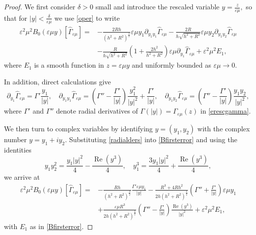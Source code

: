 \documentclass[11pt,reqno,a4paper]{amsart}
\numberwithin{equation}{section}
\newcommand{\ve}{\varepsilon}
\begin{document}
\begin{proof}
We first consider $\delta>0$ small and introduce the rescaled variable $y=\frac{z}{\ve\mu},$ so that for $|y|<\frac {\delta}{\ve\mu}$ we use \eqref{oper} to write
\begin{equation}\label{Bfirsterror}
\begin{aligned}
\ve^2\mu^2 B_{0}(\ve\mu y)[\widehat{\Gamma}_{\ve\mu}]
=& -\frac{2Rh}{(h^2+R^2)^{\frac 3 2}}\ve \mu y_1\partial_{y_1y_1}\widehat{\Gamma}_{\ve\mu}-\frac{2R}{h\sqrt{h^2+R^2}}\ve \mu y_2\partial_{y_1y_2}\widehat{\Gamma}_{\ve\mu}\\
&- \frac{R}{h\sqrt{h^2+R^2}}\left(1+\frac{2h^2}{h^2+R^2}\right)\ve\mu
\partial_{y_1}\widehat{\Gamma}_{\ve\mu}
+\ve^2\mu^2 E_1,
\end{aligned}
\end{equation}
where $E_1$ is a smooth function in $z=\ve \mu y$ and uniformly bounded as  $\ve\mu\to 0$.

In addition, direct calculations give
\begin{equation}\label{radialders}
\partial_{y_1} \widehat\Gamma_{\ve\mu}=\Gamma' \frac{y_1}{|y|},  \quad
\partial_{y_1y_1}\widehat\Gamma_{\ve\mu}
= \left(\Gamma''-\frac{\Gamma'}{|y|}\right)\frac{y_1^2}{|y|^2}+\frac{\Gamma'}{|y|}, \quad \partial_{y_1 y_2}\widehat\Gamma_{\ve\mu}=\left(\Gamma''-\frac{\Gamma'}{|y|}\right)\frac{y_1 y_2}{|y|^2},
\end{equation}
where $\Gamma'$ and $\Gamma''$ denote radial derivatives of $\Gamma(|y|)=\Gamma_{\ve\mu}(z)$ in \eqref{erescgamma}.

We then turn to complex variables by identifying $y=(y_1,y_2)$ with the complex number $y=y_1+iy_2$. Substituting \eqref{radialders} into \eqref{Bfirsterror} and using the identities
\[y_1y_2^2=\frac{y_1|y|^2}{4}-\frac{\operatorname{Re}(y^3)}{4}, \quad y_1^3=\frac{3y_1|y|^2}{4}+\frac{\operatorname{Re}(y^3)}{4},\] 
we arrive at
\begin{equation}\label{bgamma2}
\begin{aligned}
\ve^2\mu^2 B_{0}(\ve\mu y)[\widehat\Gamma_{\ve\mu}]=&-\frac{Rh}{(h^2+R^2)^{\frac{3}{2}}}\frac{\Gamma'\ve\mu y_1}{|y|}-\frac{R^3+4Rh^2}{2h(h^2+R^2)^{\frac{3}{2}}}\left(\Gamma''+\frac{\Gamma'}{|y|}\right)\ve\mu y_1 \\
&+\frac{\ve\mu R^3}{2h(h^2+R^2)^{\frac{3}{2}}}\left(\Gamma''-\frac{\Gamma'}{|y|}\right) \frac{\operatorname{Re}(y^3)}{|y|^2} +\ve^2\mu^2 E_1,
\end{aligned}
\end{equation}
with $E_1$ as in \eqref{Bfirsterror}. 


\end{proof}
\end{document}
